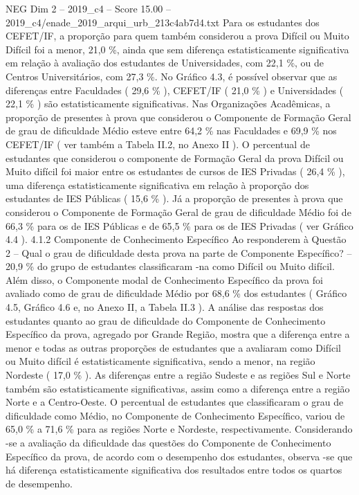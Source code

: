 \begin{textsample}{NEG Dim 2 – 2019\_c4 – Score 15.00 – 2019\_c4/enade\_2019\_arqui\_urb\_213c4ab7d4.txt}
Para os estudantes dos CEFET/IF, a proporção para quem também considerou a prova Difícil ou Muito Difícil foi a menor, 21,0 \%, ainda que sem diferença estatisticamente significativa em relação à avaliação dos estudantes de Universidades, com 22,1 \%, ou de Centros Universitários, com 27,3 \%.
No Gráfico 4.3, é possível observar que as diferenças entre Faculdades ( 29,6 \% ), CEFET/IF ( 21,0 \% ) e Universidades ( 22,1 \% ) são estatisticamente significativas.
Nas Organizações Acadêmicas, a proporção de presentes à prova que considerou o Componente de Formação Geral de grau de dificuldade Médio esteve entre 64,2 \% nas Faculdades e 69,9 \% nos CEFET/IF ( ver também a Tabela II.2, no Anexo II ).
O percentual de estudantes que considerou o componente de Formação Geral da prova Difícil ou Muito difícil foi maior entre os estudantes de cursos de IES Privadas ( 26,4 \% ), uma diferença estatisticamente significativa em relação à proporção dos estudantes de IES Públicas ( 15,6 \% ).
Já a proporção de presentes à prova que considerou o Componente de Formação Geral de grau de dificuldade Médio foi de 66,3 \% para os de IES Públicas e de 65,5 \% para os de IES Privadas ( ver Gráfico 4.4 ). 4.1.2 Componente de Conhecimento Específico Ao responderem à Questão 2 – Qual o grau de dificuldade desta prova na parte de Componente Específico? – 20,9 \% do grupo de estudantes classificaram -na como Difícil ou Muito difícil.
Além disso, o Componente modal de Conhecimento Específico da prova foi avaliado como de grau de dificuldade Médio por 68,6 \% dos estudantes ( Gráfico 4.5, Gráfico 4.6 e, no Anexo II, a Tabela II.3 ).
A análise das respostas dos estudantes quanto ao grau de dificuldade do Componente de Conhecimento Específico da prova, agregado por Grande Região, mostra que a diferença entre a menor e todas as outras proporções de estudantes que a avaliaram como Difícil ou Muito difícil é estatisticamente significativa, sendo a menor, na região Nordeste ( 17,0 \% ).
As diferenças entre a região Sudeste e as regiões Sul e Norte também são estatisticamente significativas, assim como a diferença entre a região Norte e a Centro-Oeste.
O percentual de estudantes que classificaram o grau de dificuldade como Médio, no Componente de Conhecimento Específico, variou de 65,0 \% a 71,6 \% para as regiões Norte e Nordeste, respectivamente.
Considerando -se a avaliação da dificuldade das questões do Componente de Conhecimento Específico da prova, de acordo com o desempenho dos estudantes, observa -se que há diferença estatisticamente significativa dos resultados entre todos os quartos de desempenho.

\end{textsample}
